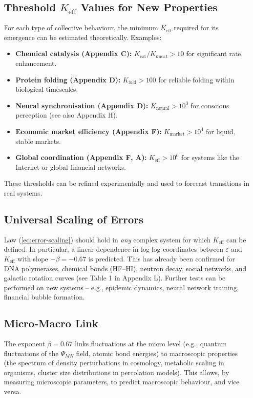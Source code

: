 \documentclass[11pt]{article}
\theoremstyle{remark}
\newcommand{\Keff}{K_{\mathrm{eff}}}
\newcommand{\Kcat}{K_{\mathrm{cat}}}
\newcommand{\Kuncat}{K_{\mathrm{uncat}}}
\newcommand{\Kfold}{K_{\mathrm{fold}}}
\newcommand{\Kneural}{K_{\mathrm{neural}}}
\newcommand{\Kmarket}{K_{\mathrm{market}}}
\begin{document}
	\subsection{Threshold \texorpdfstring{$\Keff$}{Keff} Values for New Properties}
	For each type of collective behaviour, the minimum $\Keff$ required for its emergence can be estimated theoretically. Examples:
	\begin{itemize}
		\item \textbf{Chemical catalysis (Appendix C):} $\Kcat / \Kuncat > 10$ for significant rate enhancement.
		\item \textbf{Protein folding (Appendix D):} $\Kfold > 100$ for reliable folding within biological timescales.
		\item \textbf{Neural synchronisation (Appendix D):} $\Kneural > 10^3$ for conscious perception (see also Appendix H).
		\item \textbf{Economic market efficiency (Appendix F):} $\Kmarket > 10^4$ for liquid, stable markets.
		\item \textbf{Global coordination (Appendix F, A):} $\Keff > 10^6$ for systems like the Internet or global financial networks.
	\end{itemize}
	These thresholds can be refined experimentally and used to forecast transitions in real systems.
	
	\subsection{Universal Scaling of Errors}
	Law (\ref{eq:error-scaling}) should hold in \emph{any} complex system for which $\Keff$ can be defined. In particular, a linear dependence in log‑log coordinates between $\varepsilon$ and $\Keff$ with slope $-\beta = -0.67$ is predicted. This has already been confirmed for DNA polymerases, chemical bonds (HF–HI), neutron decay, social networks, and galactic rotation curves (see Table 1 in Appendix L). Further tests can be performed on new systems – e.g., epidemic dynamics, neural network training, financial bubble formation.
	
	\subsection{Micro‑Macro Link}
	The exponent $\beta = 0.67$ links fluctuations at the micro level (e.g., quantum fluctuations of the $\Psi_{MN}$ field, atomic bond energies) to macroscopic properties (the spectrum of density perturbations in cosmology, metabolic scaling in organisms, cluster size distributions in percolation models). This allows, by measuring microscopic parameters, to predict macroscopic behaviour, and vice versa.
	
\end{document}
